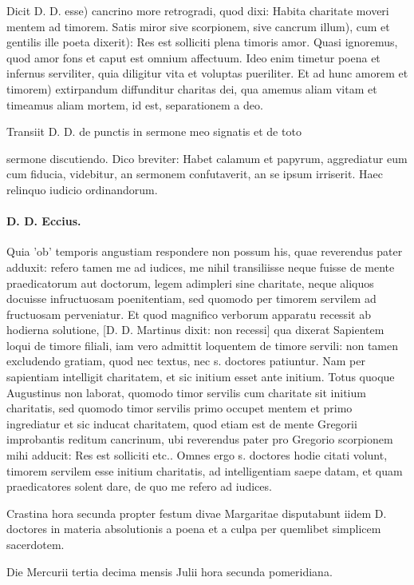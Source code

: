 Dicit D. D. esse) cancrino more retrogradi, quod dixi: Habita charitate moveri mentem ad timorem. Satis miror sive scorpionem, sive cancrum illum), cum et gentilis ille poeta dixerit): Res est solliciti plena timoris amor. Quasi ignoremus, quod amor fons et caput est omnium affectuum. Ideo enim timetur poena et infernus serviliter, quia diligitur vita et voluptas pueriliter. Et ad hunc amorem et timorem) extirpandum diffunditur charitas dei, qua amemus aliam vitam et timeamus aliam mortem, id est, separationem a deo.

Transiit D. D. de punctis in sermone meo signatis et de toto

sermone discutiendo. Dico breviter: Habet calamum et papyrum, aggrediatur eum cum fiducia, videbitur, an sermonem confutaverit, an se ipsum irriserit. Haec relinquo iudicio ordinandorum.

\paragraph*{D. D. Eccius.}

Quia 'ob' temporis angustiam respondere non possum his, quae reverendus pater adduxit: refero tamen me ad iudices, me nihil transiliisse neque fuisse de mente praedicatorum aut doctorum, legem adimpleri sine charitate, neque aliquos docuisse infructuosam poenitentiam, sed quomodo per timorem servilem ad fructuosam perveniatur. Et quod magnifico verborum apparatu recessit ab hodierna solutione, [D. D. Martinus dixit: non recessi] qua dixerat Sapientem loqui de timore filiali, iam vero admittit loquentem de timore servili: non tamen excludendo gratiam, quod nec textus, nec s. doctores patiuntur. Nam per sapientiam intelligit charitatem, et sic initium esset ante initium. Totus quoque Augustinus non laborat, quomodo timor servilis cum charitate sit initium charitatis, sed quomodo timor servilis primo occupet mentem et primo ingrediatur et sic inducat charitatem, quod etiam est de mente Gregorii improbantis reditum cancrinum, ubi reverendus pater pro Gregorio scorpionem mihi adducit: Res est solliciti etc.. Omnes ergo s. doctores hodie citati volunt, timorem servilem esse initium charitatis, ad intelligentiam saepe datam, et quam praedicatores solent dare, de quo me refero ad iudices.

Crastina hora secunda propter festum divae Margaritae disputabunt iidem D. doctores in materia absolutionis a poena et a culpa per quemlibet simplicem sacerdotem.

\marginpar{\small[378]} Die Mercurii tertia decima mensis Julii hora secunda pomeridiana.

